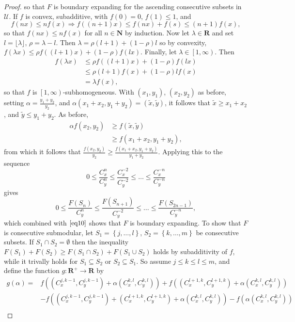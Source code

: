 \documentclass{article}
\theoremstyle{case}
\begin{document}
\begin{proof}
so that $F$ is boundary expanding for the ascending consecutive subsets in $\mathcal{U}$. If $f$ is convex, subadditive, with $f(0) = 0$, $f(1) \leq 1$, and 
\[
f(nx) \leq nf(x) \Rightarrow f((n+1)x) \leq f(nx) + f(s) \leq (n+1)f(x),
\]
so that $f(nx) \leq nf(x)$ for all $n \in \mathbf{N}$ by induction. Now let $\lambda \in \mathbf{R}$ and set $l = \lfloor \lambda \rfloor$, $\rho = \lambda - l$. Then $\lambda = \rho(l+1) + (1-\rho)l$ so by convexity, $f(\lambda x) \leq \rho f((l+1)x) + (1-\rho)f(lx)$.
Finally, let $\lambda \in \left[1, \infty\right)$. Then
\begin{align*}
f(\lambda x) &\leq \rho f((l+1)x) + (1-\rho)f(lx) \\
&\leq \rho(l+1)f(x) + (1 - \rho)lf(x) \\
&= \lambda f(x),
\end{align*}
so that $f$ is $\left[1,\infty\right)$-subhomogeneous. With $(x_1,y_1)$, $(x_2,y_2)$ as before, setting $\alpha = \frac{y_1+y_2}{y_2}$, and $\alpha(x_1 + x_2,y_1 + y_2) = (\tilde{x}, \tilde{y})$, it follows that $\tilde{x} \geq x_1+ x_2$, and $\tilde{y} \leq y_1 + y_2$.  As before,
\begin{align*}
\alpha f(x_2, y_2) &\geq f(\tilde{x}, \tilde{y}) \\
&\geq f(x_1 + x_2,y_1 + y_2),
\end{align*} 
from which it follows that $\frac{f(x_2,y_2)}{y_2} \geq \frac{f(x_1 + x_2, y_1 + y_2)}{y_1 + y_2}$. Applying this to the sequence
\[
0 \leq \frac{C_x^n}{C_y^n} \leq \frac{C_x^{-2}}{C_y^{-2}} \leq \dots \leq \frac{C_x^{-n}}{C_y^{-n}}
\]
gives
\[
0 \leq \frac{F(S_n)}{C_y^n} \leq \frac{F(S_{n+1})}{C_y^{-2}} \leq \dots \leq \frac{F(S_{2n-1})}{C_y^{-n}},
\]
which combined with $\ref{eq10}$ shows that $F$ is boundary expanding. To show that $F$ is consecutive submodular, let $S_1 = \left\lbrace j, \dots, l\right\rbrace$, $S_2 = \left\lbrace k, \dots, m\right\rbrace$ be consecutive subsets. If $S_1 \cap S_2 = \emptyset$ then the inequality $F(S_1) + F(S_2) \geq F(S_1 \cap S_2) + F(S_1 \cup S_2)$ holds by subadditivity of $f$, while it trivally holds for $S_1 \subseteq S_2$ or $S_2 \subseteq S_1$. So assume $ j \leq k \leq l \leq m$, and define the function $g\colon \mathbf{R}^+ \to \mathbf{R}$ by 
\begin{align*}
g(\alpha) = &f((C_x^{j,k-1},C_y^{j,k-1}) + \alpha(C_x^{k,l}, C_y^{k,l})) + f((C_x^{l+1,k},C_y^{l+1,k}) + \alpha(C_x^{k,l}, C_y^{k,l})) \\
&- f((C_x^{j,k-1},C_y^{j,k-1}) + (C_x^{l+1,k},C_y^{l+1,k}) + \alpha(C_x^{k,l}, C_y^{k,l}))  - f(\alpha(C_x^{k,l}, C_y^{k,l}))\\

\end{align*}
\end{proof}
\end{document}
